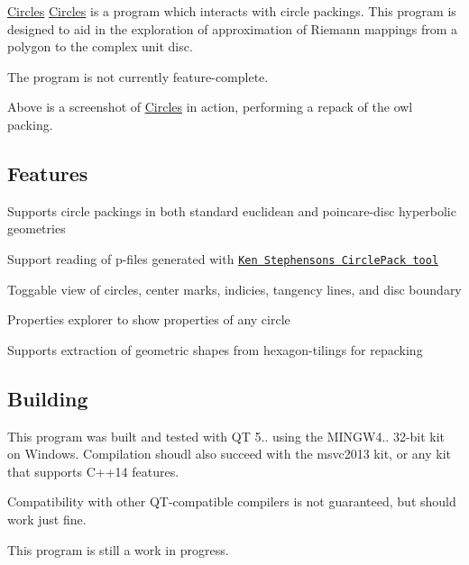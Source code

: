 \hyperlink{namespace_circles}{Circles} \hyperlink{namespace_circles}{Circles} is a program which interacts with circle packings. This program is designed to aid in the exploration of approximation of Riemann mappings from a polygon to the complex unit disc.

The program is not currently feature-\/complete.



Above is a screenshot of \hyperlink{namespace_circles}{Circles} in action, performing a repack of the \textquotesingle{}owl\textquotesingle{} packing.

\subsection*{Features}


\begin{DoxyItemize}
\item Supports circle packings in both standard euclidean and poincare-\/disc hyperbolic geometries
\item Support reading of p-\/files generated with \href{http://www.math.utk.edu/~kens/CirclePack/}{\tt Ken Stephenson\textquotesingle{}s Circle\+Pack tool}
\item Toggable view of circles, center marks, indicies, tangency lines, and disc boundary
\item Properties explorer to show properties of any circle
\item Supports extraction of geometric shapes from hexagon-\/tilings for repacking
\end{DoxyItemize}

\subsection*{Building}

This program was built and tested with Q\+T 5.. using the M\+I\+N\+G\+W4.. 32-\/bit kit on Windows. Compilation shoudl also succeed with the msvc2013 kit, or any kit that supports C++14 features.

Compatibility with other Q\+T-\/compatible compilers is not guaranteed, but should work just fine.

This program is still a work in progress. 
